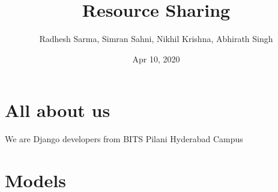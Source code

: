 \documentclass[letterpaper,10pt,english,openany,oneside]{sphinxmanual}
\title{Resource Sharing}
\date{Apr 10, 2020}
\author{Radhesh Sarma, Simran Sahni, Nikhil Krishna, Abhirath Singh}
\begin{document}
\pagestyle{empty}
\sphinxmaketitle
\pagestyle{plain}
\sphinxtableofcontents
\pagestyle{normal}
\label{\detokenize{index::doc}}



\chapter{All about us}
\label{\detokenize{modules/all-about-us:all-about-us}}\label{\detokenize{modules/all-about-us::doc}}
We are Django developers from BITS Pilani Hyderabad Campus


\chapter{Models}
\label{\detokenize{modules/models:module-blog.models}}\label{\detokenize{modules/models:models}}\label{\detokenize{modules/models::doc}}
\end{document}
